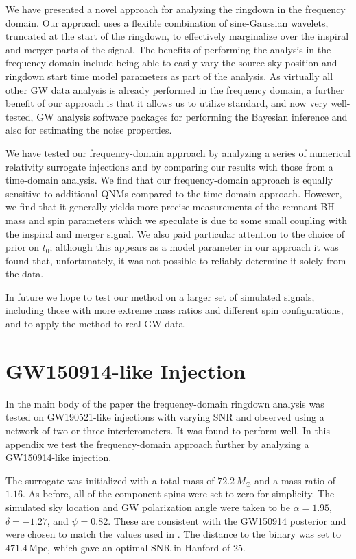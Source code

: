 We have presented a novel approach for analyzing the ringdown in the frequency domain. 
Our approach uses a flexible combination of sine-Gaussian wavelets, truncated at the start of the ringdown, to effectively marginalize over the inspiral and merger parts of the signal. 
The benefits of performing the analysis in the frequency domain include being able to easily vary the source sky position and ringdown start time model parameters as part of the analysis.
As virtually all other GW data analysis is already performed in the frequency domain, a further benefit of our approach is that it allows us to utilize standard, and now very well-tested, GW analysis software packages for performing the Bayesian inference and also for estimating the noise properties.

We have tested our frequency-domain approach by analyzing a series of numerical relativity surrogate injections and by comparing our results with those from a time-domain analysis. 
We find that our frequency-domain approach is equally sensitive to additional QNMs compared to the time-domain approach.
However, we find that it generally yields more precise measurements of the remnant BH mass and spin parameters which we speculate is due to some small coupling with the inspiral and merger signal.
We also paid particular attention to the choice of prior on $t_0$; although this appears as a model parameter in our approach it was found that, unfortunately, it was not possible to reliably determine it solely from the data.

In future we hope to test our method on a larger set of simulated signals, including those with more extreme mass ratios and different spin configurations, and to apply the method to real GW data.

\section{GW150914-like Injection}\label{app:GW150914}

In the main body of the paper the frequency-domain ringdown analysis was tested on GW190521-like injections with varying SNR and observed using a network of two or three interferometers. It was found to perform well. In this appendix we test the frequency-domain approach further by analyzing a GW150914-like injection.

The surrogate was initialized with a total mass of $72.2\,M_\odot$ and a mass ratio of $1.16$. 
As before, all of the component spins were set to zero for simplicity. 
The simulated sky location and GW polarization angle were taken to be $\alpha = 1.95$, $\delta = -1.27$, and $\psi = 0.82$. These are consistent with the GW150914 posterior and were chosen to match the values used in \cite{Isi:2019aib}.
The distance to the binary was set to $471.4\,\mathrm{Mpc}$, which gave an optimal SNR in Hanford of 25.

